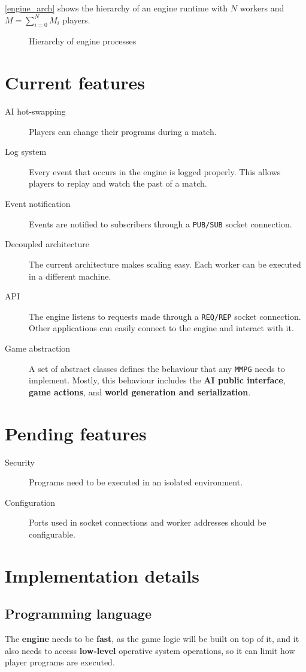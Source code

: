 \documentclass[a4paper,11pt,titlepage,abstract,numbers=noenddot,automark,mnsy,intlimits,rgb,dvipsnames]{report}
\begin{document}
\autoref{engine_arch} shows the hierarchy of an engine runtime with $N$ workers and $M = \sum_{i=0}^{N} M_i$ players.
\begin{figure}[H]
\noindent\resizebox{\textwidth}{!}{

}
\caption{Hierarchy of engine processes}
\label{engine_arch}
\end{figure}
\section{Current features}
\begin{description}
\item[AI hot-swapping]
Players can change their programs during a match.
\item[Log system]
Every event that occurs in the engine is logged properly. This allows players to replay and
  watch the past of a match.
\item[Event notification]
Events are notified to subscribers through a \texttt{PUB/SUB} socket connection.
\item[Decoupled architecture]
The current architecture makes scaling easy. Each worker can be executed in a
  different machine.
\item[API]
The engine listens to requests made through a \texttt{REQ/REP} socket connection. Other applications can
  easily connect to the engine and interact with it.
\item[Game abstraction]
A set of abstract classes defines the behaviour that any \texttt{MMPG} needs to implement.
  Mostly, this behaviour includes the \textbf{AI public interface}, \textbf{game actions}, and \textbf{world generation and
  serialization}.
\end{description}
\section{Pending features}
\begin{description}
\item[Security]
Programs need to be executed in an isolated environment.
\item[Configuration]
Ports used in socket connections and worker addresses should be configurable.
\end{description}
\section{Implementation details}
\subsection{Programming language}
\indent
The \textbf{engine} needs to be \textbf{fast}, as the game logic will be built on top of it, and it also needs to access
\textbf{low-level} operative system operations, so it can limit how player programs are executed.
\end{document}
